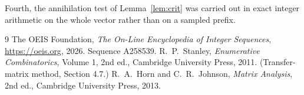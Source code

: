 \documentclass[11pt,a4paper]{article}
\theoremstyle{plain}
\theoremstyle{definition}
\begin{document}
Fourth, the annihilation test of Lemma~\ref{lem:crit} was carried out in exact integer
arithmetic on the whole vector rather than on a sampled prefix.

\begin{thebibliography}{9}
 The OEIS Foundation, \emph{The On-Line Encyclopedia of Integer
Sequences}, \url{https://oeis.org}, 2026. Sequence A258539.
 R.~P.~Stanley, \emph{Enumerative Combinatorics}, Volume 1, 2nd ed.,
Cambridge University Press, 2011. (Transfer-matrix method, Section 4.7.)
 R.~A.~Horn and C.~R.~Johnson, \emph{Matrix Analysis}, 2nd ed., Cambridge
University Press, 2013.
\end{thebibliography}
\end{document}
